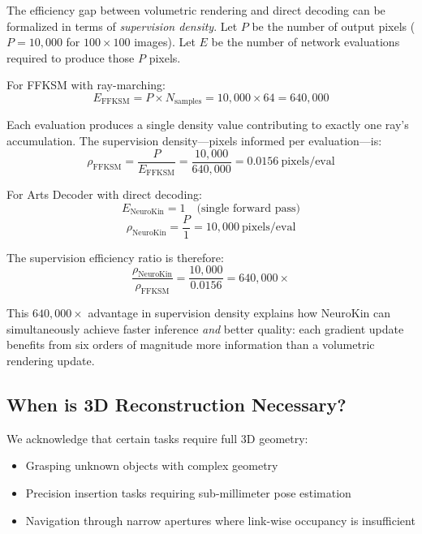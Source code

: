 \documentclass[12pt,a4paper,oneside]{report}
\begin{document}
The efficiency gap between volumetric rendering and direct decoding can be formalized in terms of \textit{supervision density}. Let $P$ be the number of output pixels ($P = 10,000$ for $100 \times 100$ images). Let $E$ be the number of network evaluations required to produce those $P$ pixels.

For FFKSM with ray-marching:
\begin{equation}E_{\text{FFKSM}} = P \times N_{\text{samples}} = 10,000 \times 64 = 640,000
\end{equation}

Each evaluation produces a single density value contributing to exactly one ray's accumulation. The supervision density---pixels informed per evaluation---is:
\begin{equation}\rho_{\text{FFKSM}} = \frac{P}{E_{\text{FFKSM}}} = \frac{10,000}{640,000} = 0.0156\ \text{pixels/eval}
\end{equation}

For Arts Decoder with direct decoding:
\begin{equation}E_{\text{NeuroKin}} = 1 \quad \text{(single forward pass)}
\end{equation}
\begin{equation}\rho_{\text{NeuroKin}} = \frac{P}{1} = 10,000\ \text{pixels/eval}
\end{equation}

The supervision efficiency ratio is therefore:
\begin{equation}\frac{\rho_{\text{NeuroKin}}}{\rho_{\text{FFKSM}}} = \frac{10,000}{0.0156} = 640,000\times
\end{equation}

This $640,000\times$ advantage in supervision density explains how NeuroKin can simultaneously achieve faster inference \textit{and} better quality: each gradient update benefits from six orders of magnitude more information than a volumetric rendering update.
\subsection{When is 3D Reconstruction Necessary?}
\label{subsec:when_is_3d_reconstruction_necessary}

We acknowledge that certain tasks require full 3D geometry:
\begin{itemize}
    \item Grasping unknown objects with complex geometry

    \item Precision insertion tasks requiring sub-millimeter pose estimation

    \item Navigation through narrow apertures where link-wise occupancy is insufficient

\end{itemize}
\end{document}
